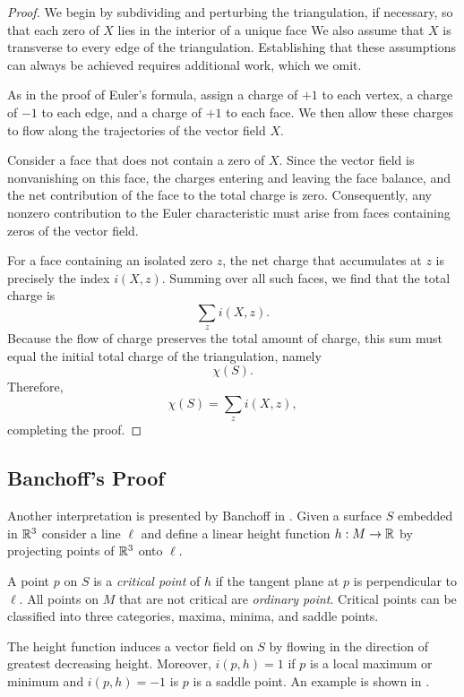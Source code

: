 \begin{proof}

We begin by subdividing and perturbing the triangulation, if necessary, 
so that each zero of $X$ lies in the interior of a unique face
We also assume that $X$ is transverse to every edge of the triangulation. 
Establishing that these assumptions can always be achieved requires additional work,
 which we omit.


As in the proof of Euler's formula, assign a charge of $+1$ to each vertex, 
a charge of $-1$ to each edge, and a charge of $+1$ to each face. 
We then allow these charges to flow along the trajectories of the vector field $X$.


Consider a face that does not contain a zero of $X$.
 Since the vector field is nonvanishing on this face, the charges 
 entering and leaving the face balance, and the net contribution 
 of the face to the total charge is zero. Consequently, any nonzero 
 contribution to the Euler characteristic must arise from faces containing 
 zeros of the vector field.
 
 For a face containing an isolated zero $z$, the net charge that accumulates at $z$ is precisely the index $i(X,z)$. Summing over all such faces, we find that the total charge is
$$\sum_z i(X,z).$$
Because the flow of charge preserves the total amount of charge, this sum must equal the initial total charge of the triangulation, namely
$$\chi(S).$$
Therefore,
$$\chi(S)=\sum_z i(X,z),$$
completing the proof.
\end{proof}


\subsection{Banchoff's Proof}
Another interpretation is presented by Banchoff in \cite{banchoff_critical_1970}.
Given a surface $S$ embedded in $\mathbb{R}^3$ consider a line $\ell$ and define a 
linear height function $h:M \to \mathbb{R}$
by projecting points of $\mathbb{R}^3$ onto  $\ell$. 

A point $p$ on $S$
is a \emph{critical point} of $h$ if the tangent plane at $p$ is perpendicular to $\ell$.
All points on $M$ that are not critical are \emph{ordinary point}.
Critical points can be classified into three categories, maxima, minima, and saddle points.

The height function induces a vector field on $S$ by flowing in the direction
of greatest decreasing height.
Moreover, $i(p,h)=1$ if $p$ is a  local maximum or minimum and $i(p,h)=-1$ is $p$ is a saddle point.
An example is shown in .


